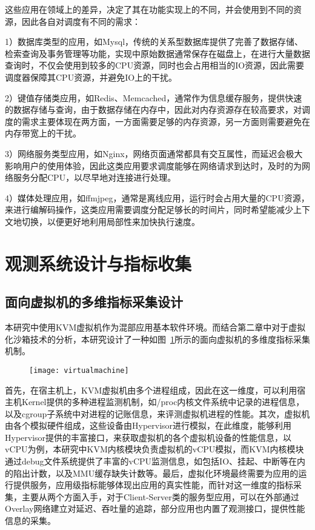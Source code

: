 这些应用在领域上的差异，决定了其在功能实现上的不同，并会使用到不同的资源，因此各自对调度有不同的需求：

1）数据库类型的应用，如Mysql，传统的关系型数据库提供了完善了数据存储、检索查询及事务管理等功能，实现中原始数据通常保存在磁盘上，在进行大量数据查询时，不仅会使用到较多的CPU资源，同时也会占用相当的IO资源，因此需要调度器保障其CPU资源，并避免IO上的干扰。

2）键值存储类应用，如Redis、Memcached，通常作为信息缓存服务，提供快速的数据存储与查询，由于数据存储在内存中，因此对内存资源存在较高要求，对调度的需求主要体现在两方面，一方面需要足够的内存资源，另一方面则需要避免在内存带宽上的干扰。

3）网络服务类型应用，如Nginx，网络页面通常都具有交互属性，而延迟会极大影响用户的使用体验，因此这类应用要求调度能够在网络请求到达时，及时的为网络服务分配CPU，以尽早地对连接进行处理。

4）媒体处理应用，如ffmjpeg，通常是离线应用，运行时会占用大量的CPU资源，来进行编解码操作，这类应用需要调度分配足够长的时间片，同时希望能减少上下文地切换，以便更好地利用局部性来加快执行速度。

\section{观测系统设计与指标收集}

\subsection{面向虚拟机的多维指标采集设计}


本研究中使用KVM虚拟机作为混部应用基本软件环境。而结合第二章中对于虚拟化沙箱技术的分析，本研究设计了一种如图~\ref{fig:virtualmachine}所示的面向虚拟机的多维度指标采集机制。

\begin{figure}[!htbp]
    \centering
    \texttt{[image: virtualmachine]}
    \label{fig:virtualmachine}
\end{figure}

首先，在宿主机上，KVM虚拟机由多个进程组成，因此在这一维度，可以利用宿主机Kernel提供的多种进程监测机制，如/proc内核文件系统中记录的进程信息，以及cgroup子系统中对进程的记账信息，来评测虚拟机进程的性能。其次，虚拟机由各个模拟硬件组成，这些设备由Hypervisor进行模拟，在此维度，能够利用Hypervisor提供的丰富接口，来获取虚拟机的各个虚拟机设备的性能信息，以vCPU为例，本研究中KVM内核模块负责虚拟机的vCPU模拟，而KVM内核模块通过debug文件系统提供了丰富的vCPU监测信息，如包括IO、挂起、中断等在内的陷出计数，以及MMU缓存缺失计数等。最后，虚拟化环境最终需要为应用的运行提供服务，应用级指标能够体现出应用的真实性能，而针对这一维度的指标采集，主要从两个方面入手，对于Client-Server类的服务型应用，可以在外部通过Overlay网络建立对延迟、吞吐量的追踪，部分应用也内置了观测接口，提供性能信息的采集。

